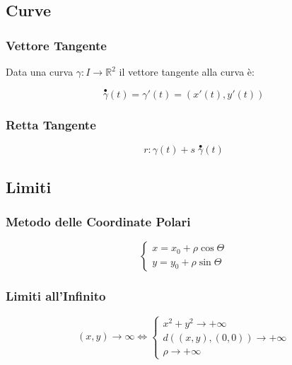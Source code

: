 \documentclass{article}
\begin{document}
\subsection{Curve}

\subsubsection{Vettore Tangente}

Data una curva $\gamma: I \to \mathbb{R}^2$ il vettore tangente alla curva è:

\begin{equation*}
    \overset{\bullet}{\gamma}(t) = \gamma'(t) = (x'(t), y'(t))
\end{equation*}

\subsubsection{Retta Tangente}

\begin{equation*}
    r: \gamma(t) + s \; \overset{\bullet}{\gamma}(t)
\end{equation*}

\subsection{Limiti}

\subsubsection{Metodo delle Coordinate Polari}

\begin{equation*}
    \begin{cases}
        x = x_0 + \rho \cos \Theta \\
        y = y_0 + \rho \sin \Theta
    \end{cases}
\end{equation*}

\subsubsection{Limiti all'Infinito}

\begin{equation*}
    (x, y) \to \infty \Leftrightarrow 
    \begin{cases}
        x^2 + y^2 \to +\infty \\
        d((x, y), (0, 0)) \to +\infty \\
        \rho \to +\infty
    \end{cases}
\end{equation*}
\end{document}
